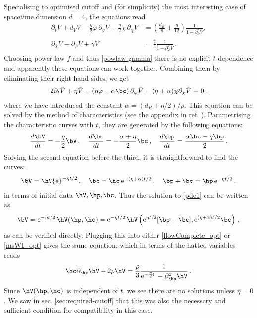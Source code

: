 \documentclass[11pt]{book} %
\newcommand{\be}{\begin{equation}}
\newcommand{\ee}{\end{equation}}
\newcommand{\bg}{\bar g}
\begin{document}
Specialising to optimised cutoff and (for simplicity) the most interesting case of spacetime dimension $d=4$, the equations read
\begin{align}
\label{flowComplete_opt}
\partial_t\bar{V}+
d_V \bar V - \frac{\eta}{2} \bar \varphi \, \partial_{\bar\varphi}\bar V -\frac{\eta}{2} \bar \chi \, \partial_{\bar\chi}\bar V &= \left(  \frac{d_R}{6} + \frac{\eta}{12} \right) \frac{1}{1 -  \partial^2_{\bar\varphi}\bar V},\\
\label{msWI_opt}
\partial_{\bar\chi}\bar V - \partial_{\bar\varphi}\bar V + \bar{\gamma} \bar V &= \frac{\bar{\gamma}}{6} \frac{1}{1 - \partial^2_{\bar\varphi}\bar V}\,.
\end{align}
Choosing power law $f$ and thus \eqref{powlaw-gamma} there is no explicit $t$ dependence and apparently these equations can work together. 
Combining them %
by eliminating their right hand sides, we get
\be
\label{pde1}
2\partial_t\bar{V}+\eta\bar{V}-\left(\eta\bar\varphi-\alpha\bc\right)\partial_{\bar{\varphi}}\bar{V}-(\eta+\alpha)\bar\chi\partial_{\bar{\chi}} \bar{V}=0\,,
\ee
where we have introduced the constant $\alpha = (d_R+\eta/2)/\rho$.
This equation can be solved by the method of characteristics (see \eg the appendix in ref. \cite{Dietz:2015owa}). Parametrising the characteristic curves with $t$, they are generated by the following equations:
\be 
\frac{d\bV}{dt} = -\frac{\eta}{2}\bV\,,\quad\frac{d\bc}{dt}=-\frac{\alpha+\eta}{2}\bc\,,\quad \frac{d\bp}{dt}=\frac{\alpha\bc-\eta\bp}{2}\,.
\ee
Solving the second equation before the third, it is straightforward to find the curves:
\be 
\bV = \hV {\rm e}^{-\eta t/2}\,,\quad \bc = \hc\, {\rm e}^{-(\eta+\alpha)t/2}\,,\quad \bp+\bc = \hp\, {\rm e}^{-\eta t/2}\,,
\ee
in terms of initial data $\hV,\hp,\hc$.
Thus the solution to \eqref{pde1} can be written as
\be 
\bV ={\rm e}^{-\eta t/2}\, \hV(\hp,\hc) ={\rm e}^{-\eta t/2} \,\hV\left({\rm e}^{\eta t/2}[\bp+\bc],{\rm e}^{(\eta+\alpha)t/2}\bc\right)\,,
\ee
as can be verified directly. Plugging this into either \eqref{flowComplete_opt} or \eqref{msWI_opt} gives the same equation, which in terms of the hatted variables reads
\be 
\hc \partial_{\hc}\hV+2\rho\hV = \frac{\rho}{3}\frac{1}{{\rm e}^{-\frac{\eta}{2} t} \,-\partial^2_{\hp}\hV}\,.
\ee
Since $\hV(\hp,\hc)$ is independent of $t$, we see there are no solutions unless $\eta=0$. 
We saw in sec. \ref{sec:required-cutoff} that this was also the necessary and sufficient condition for compatibility in this case. 
\end{document}
